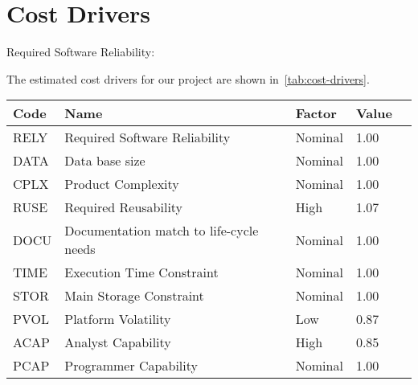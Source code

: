\section{Cost Drivers}

\begin{description}

    \item[Required Software Reliability:]
\end{description}

The estimated cost drivers for our project are shown in~\autoref{tab:cost-drivers}.

\begin{table}[h]
    \centering
    \begin{tabular}{| l | l | l | l | l |}
        \hline
        \textbf{Code}   & \textbf{Name}                             & \textbf{Factor}      & \textbf{Value}    \\
        \hline
        RELY            & Required Software Reliability             & Nominal              & 1.00              \\
        \hline
        DATA            & Data base size                            & Nominal              & 1.00              \\
        \hline
        CPLX            & Product Complexity                        & Nominal              & 1.00              \\
        \hline
        RUSE            & Required Reusability                      & High                 & 1.07              \\
        \hline
        DOCU            & Documentation match to life-cycle needs   & Nominal              & 1.00              \\
        \hline
        TIME            & Execution Time Constraint                 & Nominal              & 1.00              \\
        \hline
        STOR            & Main Storage Constraint                   & Nominal              & 1.00              \\
        \hline
        PVOL            & Platform Volatility                       & Low                  & 0.87              \\
        \hline
        ACAP            & Analyst Capability                        & High                 & 0.85              \\
        \hline
        PCAP            & Programmer Capability                     & Nominal              & 1.00              \\

\end{tabular}
\end{table}

